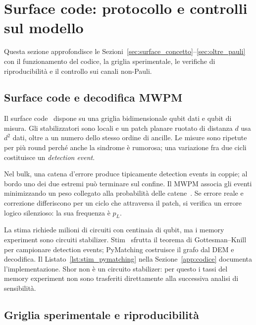 \section{Surface code: protocollo e controlli sul modello}
\label{app:surface_protocollo_generale}
\begin{onehalfspace}

Questa sezione approfondisce le Sezioni~\ref{sec:surface_concetto}--\ref{sec:oltre_pauli}
con il funzionamento del codice, la griglia sperimentale, le verifiche di
riproducibilità e il controllo sui canali non-Pauli.

\subsection{Surface code e decodifica MWPM}
\label{app:surface_teoria}

Il surface code~\cite{kitaev2003,fowler2012} dispone su una griglia
bidimensionale qubit dati e qubit di misura. Gli stabilizzatori sono locali
e un patch planare ruotato di distanza $d$ usa $d^2$ dati, oltre a un
numero dello stesso ordine di ancille. Le misure sono ripetute per più
round perché anche la sindrome è rumorosa; una variazione fra due cicli
costituisce un \emph{detection event}.

Nel bulk, una catena d'errore produce tipicamente detection events in
coppie; al bordo uno dei due estremi può terminare sul confine. Il
\ac{MWPM} associa gli eventi minimizzando un peso collegato alla
probabilità delle catene~\cite{pymatching2021}. Se errore reale e
correzione differiscono per un ciclo che attraversa il patch, si verifica
un errore logico silenzioso: la sua frequenza è $p_L$.

La stima richiede milioni di circuiti con centinaia di qubit, ma i memory
experiment sono circuiti stabilizer. Stim~\cite{stim2021} sfrutta il
teorema di Gottesman--Knill per campionare detection events; PyMatching
costruisce il grafo dal \ac{DEM} e decodifica. Il Listato~\ref{lst:stim_pymatching}
nella Sezione~\ref{app:codice} documenta l'implementazione. Shor non è un
circuito stabilizer: per questo i tassi del memory experiment non sono
trasferiti direttamente alla successiva analisi di sensibilità.

\subsection{Griglia sperimentale e riproducibilità}
\label{app:surface_protocollo}

\begin{table}[H]


\end{table}
\end{onehalfspace}
